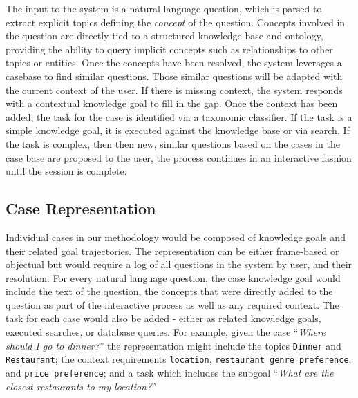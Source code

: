 \documentclass{llncs}
\begin{document}
The input to the system is a natural language question, which is parsed to extract explicit topics defining the \textit{concept} of the question. Concepts involved in the question are directly tied to a structured knowledge base and ontology, providing the ability to query implicit concepts such as relationships to other topics or entities. Once the concepts have been resolved, the system leverages a casebase to find similar questions. Those similar questions will be adapted with the current context of the user. If there is missing context, the system responds with a contextual knowledge goal to fill in the gap. Once the context has been added, the task for the case is identified via a taxonomic classifier. If the task is a simple knowledge goal, it is executed against the knowledge base or via search. If the task is complex, then then new, similar questions based on the cases in the case base are proposed to the user, the process continues in an interactive fashion until the session is complete.

\subsection{Case Representation}

Individual cases in our methodology would be composed of knowledge goals and their related goal trajectories. The representation can be either frame-based or objectual but would require a log of all questions in the system by user, and their resolution. For every natural language question, the case knowledge goal would include the text of the question, the concepts that were directly added to the question as part of the interactive process as well as any required context. The task for each case would also be added - either as related knowledge goals, executed searches, or database queries. For example, given the case ``\textit{Where should I go to dinner?}'' the representation might include the topics \texttt{Dinner} and \texttt{Restaurant}; the context requirements \texttt{location}, \texttt{restaurant genre preference}, and \texttt{price preference}; and a task which includes the subgoal ``\textit{What are the closest restaurants to my location?}''
\end{document}
